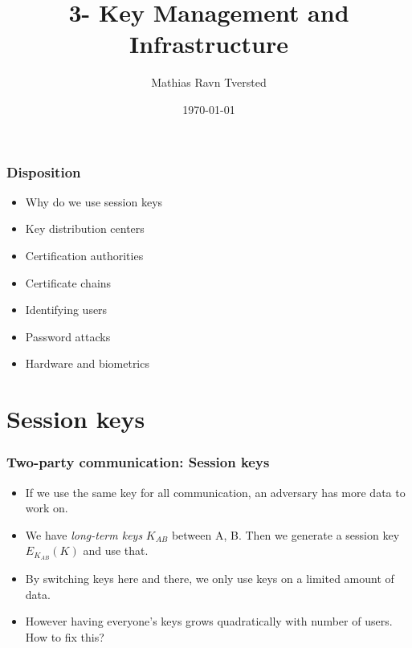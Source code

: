 

\title{3- Key Management and Infrastructure}   
\author{Mathias Ravn Tversted} 
\date{\today} 



\frame{\titlepage} 











	\begin{frame}
		\frametitle{Disposition}
			\begin{itemize}
				\item Why do we use session keys
				\item Key distribution centers
				\item Certification authorities
				\item Certificate chains
				\item Identifying users
				\item Password attacks
				\item Hardware and biometrics
			\end{itemize}
	\end{frame}


	\section{Session keys}
		\begin{frame}
			\frametitle{Two-party communication: Session keys}
				\begin{itemize}
					\item If we use the same key for all communication, an adversary has more data to work on. 
					\item We have \textit{long-term keys} $K_{AB}$ between A, B. Then we generate a session key $E_{K_{AB}}(K)$ and use that. 
					\item By switching keys here and there, we only use keys on a limited amount of data.  	
					\item However having everyone's keys grows quadratically with number of users. How to fix this?
				\end{itemize}
		\end{frame}	

